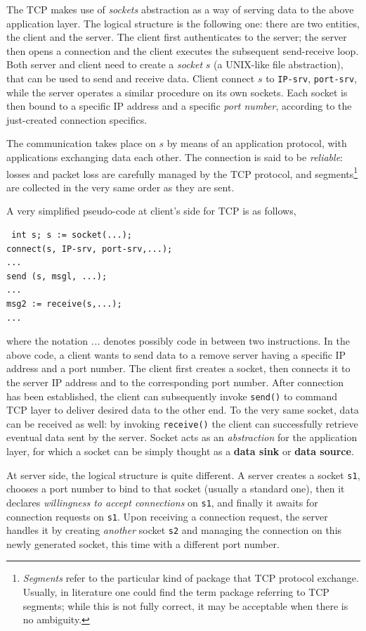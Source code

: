 \documentclass[10pt]{\classname}
\begin{document}
The TCP makes use of \emph{sockets} abstraction as a way of serving data to the
above application layer. The logical structure is the following one: there are
two entities, the client and the server. The client first authenticates to the
server; the server then opens a connection and the client executes the
subsequent send-receive loop. Both server and client need to create a
\emph{socket} $s$ (a UNIX-like file abstraction), that can be used to send and
receive data. Client connect $s$ to \texttt{IP-srv}, \texttt{port-srv}, while
the server operates a similar procedure on its own sockets. Each socket is then
bound to a specific IP address and a specific \emph{port number}, according to
the just-created connection specifics.

The communication takes place on $s$ by means of an application protocol, with
applications exchanging data each other. The connection is said to be
\emph{reliable}: losses and packet loss are carefully managed by the TCP
protocol, and segments\footnote{\emph{Segments} refer to the particular kind of
package that TCP protocol exchange. Usually, in literature one could find the
term package referring to TCP segments; while this is not fully correct, it may
be acceptable when there is no ambiguity.} are collected in the very same order
as they are sent.

A very simplified pseudo-code at client's side for TCP is as follows,

\begin{verbatim} int s; s := socket(...); 
connect(s, IP-srv, port-srv,...); 
...
send (s, msgl, ...); 
... 
msg2 := receive(s,...); 
... 
\end{verbatim}

where the notation \emph{...} denotes possibly code in between two
instructions. In the above code, a client wants to send data to a remove server
having a specific IP address and a port number. The client first creates a
socket, then connects it to the server IP address and to the corresponding port
number. After connection has been established, the client can subsequently
invoke \texttt{send()} to command TCP layer to deliver desired data to the
other end. To the very same socket, data can be received as well: by invoking
\texttt{receive()} the client can successfully retrieve eventual data sent by
the server. Socket acts as an \emph{abstraction} for the application layer, for
which a socket can be simply thought as a \textbf{data sink} or \textbf{data
source}.

At server side, the logical structure is quite different. A server creates
a socket \texttt{s1}, chooses a port number to bind to that socket (usually a
standard one), then it declares \emph{willingness to accept connections} on
\texttt{s1}, and finally it awaits for connection requests on \texttt{s1}. Upon
receiving a connection request, the server handles it by creating
\emph{another} socket \texttt{s2} and managing the connection on this newly
generated socket, this time with a different port number. 
\end{document}

